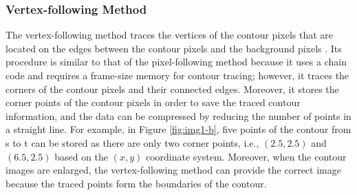 \subsubsection{Vertex-following Method}

The vertex-following method traces the vertices of the contour pixels that are located on the edges between the contour pixels and the background pixels \cite{Miyatake1997Contour}. Its procedure is similar to that of the pixel-following method because it uses a chain code and requires a frame-size memory for contour tracing; however, it traces the corners of the contour pixels and their connected edges. Moreover, it stores the corner points of the contour pixels in order to save the traced contour information, and the data can be compressed by reducing the number of points in a straight line. For example, in Figure \ref{fig:img1-b}, five points of the contour from s to t can be stored as there are only two corner points, i.e., $(2.5, 2.5)$ and $(6.5, 2.5)$ based on the $(x, y)$ coordinate system. Moreover, when the contour images are enlarged, the vertex-following method can provide the correct image \cite{Miyatake1997Contour} because the traced points form the boundaries of the contour.

